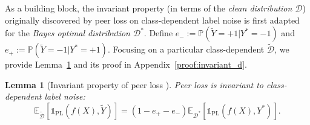 \documentclass[final]{cvpr}
\newcommand{\PP}{\mathbb P}
\newcommand{\BR}{\mathds 1}
\newcommand{\E}{\mathbb E}
\newtheorem{lemma}{Lemma}
\begin{document}
As a building block, the invariant property (in terms of the \textit{clean distribution $\mathcal D$}) originally discovered by peer loss on class-dependent label noise is first adapted for the \textit{Bayes optimal distribution $\mathcal D^*$}. Define $e_- := \PP(\widetilde Y=+1|Y^* = -1)$ and $e_+ := \PP(\widetilde Y=-1|Y^* = +1)$.
Focusing on a particular class-dependent $\widetilde{\mathcal D}$, we provide Lemma~\ref{lem:invariant_d} and its proof in Appendix~\ref{proof:invariant_d}.
\begin{lemma}[Invariant property of peer loss \cite{liu2019peer}]\label{lem:invariant_d}
Peer loss is invariant to class-dependent label noise:
{\small \begin{equation}\label{eq:peerBinary}
    \E_{\widetilde{\mathcal D}}[{\BR_{\text{PL}}}(f(X),\widetilde{Y})] =(1-e_+-e_-)\E_{\mathcal D^*}[{\BR_{\text{PL}}}(f(X),Y^*)].
\end{equation}}
\end{lemma}
\end{document}
